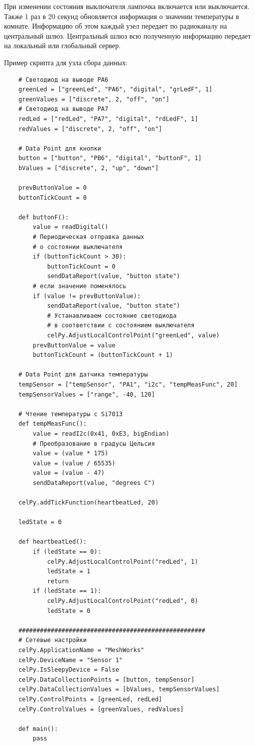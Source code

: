 \documentclass[11pt]{article}
\begin{document}
При изменении состояния выключателя лампочка включается или выключается. Также 1 раз в 20
секунд обновляется информация о значении температуры в комнате. Информацию об этом
каждый узел передает по радиоканалу на центральный шлюз. Центральный шлюз всю
полученную информацию передает на локальный или глобальный сервер.

Пример скрипта для узла сбора данных:
\begin{verbatim}
    # Светодиод на выводе PA6 
    greenLed = ["greenLed", "PA6", "digital", "grLedF", 1]
    greenValues = ["discrete", 2, "off", "on"]
    # Светодиод на выводе PA7 
    redLed = ["redLed", "PA7", "digital", "rdLedF", 1]
    redValues = ["discrete", 2, "off", "on"]
      
    # Data Point для кнопки
    button = ["button", "PB6", "digital", "buttonF", 1] 
    bValues = ["discrete", 2, "up", "down"] 
    
    prevButtonValue = 0
    buttonTickCount = 0 
      
    def buttonF():
        value = readDigital()
        # Периодическая отправка данных
        # о состоянии выключателя
        if (buttonTickCount > 30):
            buttonTickCount = 0
            sendDataReport(value, "button state")
        # если значение поменялось 
        if (value != prevButtonValue):  
            sendDataReport(value, "button state")
            # Устанавливаем состояние светодиода
            # в соответствии с состоянием выключателя
            celPy.AdjustLocalControlPoint("greenLed", value)    
        prevButtonValue = value
        buttonTickCount = (buttonTickCount + 1)
        
    # Data Point для датчика температуры
    tempSensor = ["tempSensor", "PA1", "i2c", "tempMeasFunc", 20]
    tempSensorValues = ["range", -40, 120]
    
    # Чтение температуры с Si7013
    def tempMeasFunc():
        value = readI2c(0x41, 0xE3, bigEndian)
        # Преобразование в градусы Цельсия
        value = (value * 175)
        value = (value / 65535)
        value = (value - 47)
        sendDataReport(value, "degrees C")
    
    celPy.addTickFunction(heartbeatLed, 20) 
      
    ledState = 0
      
    def heartbeatLed(): 
        if (ledState == 0): 
            celPy.AdjustLocalControlPoint("redLed", 1)
            ledState = 1
            return
        if (ledState == 1): 
            celPy.AdjustLocalControlPoint("redLed", 0)
            ledState = 0
      
    ####################################################
    # Сетевые настройки
    celPy.ApplicationName = "MeshWorks"  
    celPy.DeviceName = "Sensor 1" 
    celPy.IsSleepyDevice = False
    celPy.DataCollectionPoints = [button, tempSensor] 
    celPy.DataCollectionValues = [bValues, tempSensorValues]
    celPy.ControlPoints = [greenLed, redLed]
    celPy.ControlValues = [greenValues, redValues] 
      
    def main(): 
        pass
\end{verbatim}
\end{document}
